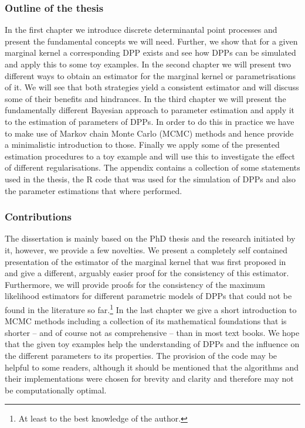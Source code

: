 \subsubsection{Outline of the thesis}
In the first chapter we introduce discrete determinantal point processes and present the fundamental concepts we will need. Further, we show that for a given marginal kernel a corresponding DPP exists and see how DPPs can be simulated and apply this to some toy examples. In the second chapter we will present two different ways to obtain an estimator for the marginal kernel or parametrisations of it. We will see that both strategies yield a consistent estimator and will discuss some of their benefits and hindrances. In the third chapter we will present the fundamentally different Bayesian approach to parameter estimation and apply it to the estimation of parameters of DPPs. In order to do this in practice we have to make use of Markov chain Monte Carlo (MCMC) methods and hence provide a minimalistic introduction to those. Finally we apply some of the presented estimation procedures to a toy example and will use this to investigate the effect of different regularisations. 
The appendix contains a collection of some statements used in the thesis, the R code that was used for the simulation of DPPs and also the parameter estimations that where performed.

\subsubsection{Contributions}
The dissertation is mainly based on the PhD thesis \cite{kulesza2012learning} and the research initiated by it, however, we provide a few novelties. We present a completely self contained presentation of the estimator of the marginal kernel that was first proposed in \cite{urschel2017learning} and give a different, arguably easier proof for the consistency of this estimator. Furthermore, we will provide proofs for the consistency of the maximum likelihood estimators for different parametric models of DPPs that could not be found in the literature so far.\footnote{At least to the best knowledge of the author.} In the last chapter we give a short introduction to MCMC methods including a collection of its mathematical foundations that is shorter -- and of course not as comprehensive -- than in most text books. We hope that the given toy examples help the understanding of DPPs and the influence on the different parameters to its properties. The provision of the code may be helpful to some readers, although it should be mentioned that the algorithms and their implementations were chosen for brevity and clarity and therefore may not be computationally optimal.


